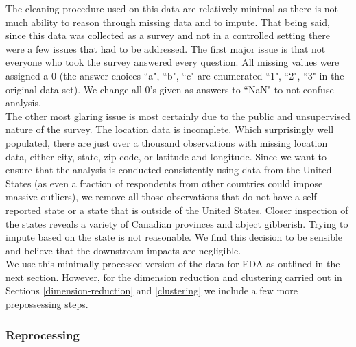 \documentclass[10pt,letterpaper]{article}
\begin{document}
The cleaning procedure used on this data are relatively minimal as there is not much ability to reason through missing data and to impute. That being said, since this data was collected as a survey and not in a controlled setting there were a few issues that had to be addressed. The first major issue is that not everyone who took the survey answered every question. All missing values were assigned a 0 (the answer choices ``a", ``b", ``c" are enumerated ``1", ``2", ``3" in the original data set). We change all 0's given as answers to ``NaN" to not confuse analysis.\\

The other most glaring issue is most certainly due to the public and unsupervised nature of the survey. The location data is incomplete. Which surprisingly well populated, there are just over a thousand observations with missing location data, either city, state, zip code, or latitude and longitude. Since we want to ensure that the analysis is conducted consistently using data from the United States (as even a fraction of respondents from other countries could impose massive outliers), we remove all those observations that do not have a self reported state or a state that is outside of the United States. Closer inspection of the states reveals a variety of Canadian provinces and abject gibberish. Trying to impute based on the state is not reasonable. We find this decision to be sensible and believe that the downstream impacts are negligible.\\

We use this minimally processed version of the data for EDA as outlined in the next section. However, for the dimension reduction and clustering carried out in Sections \ref{dimension-reduction} and \ref{clustering} we include a few more prepossessing steps. 

\subsubsection{Reprocessing}

\end{document}
